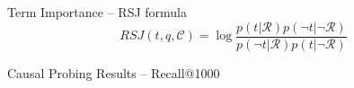 \documentclass[aspectratio=169]{beamer}
\begin{document}
\begin{frame}{Term Importance -- RSJ formula \cite{Formal__match_your_words}}
    \begin{equation}
        RSJ(t,q, \mathcal{C}) = \log \frac{p(t|\mathcal{R})p( \neg t | \neg \mathcal{R})}{p(\neg t|\mathcal{R})p( t | \neg \mathcal{R})}
    \end{equation}
\end{frame}

\begin{frame}{Causal Probing Results -- Recall@1000}
    \begin{figure}[!ht]
        \centering
    \end{figure}
\end{frame}
\end{document}
